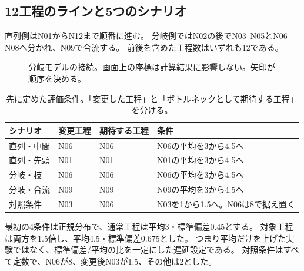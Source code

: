 \documentclass[a4paper,11pt]{ltjsarticle}
\begin{document}
\subsection{12工程のラインと5つのシナリオ}
直列例はN01からN12まで順番に進む。
分岐例ではN02の後でN03--N05とN06--N08へ分かれ、N09で合流する。
前後を含めた工程数はいずれも12である。
\begin{figure}[htbp]\centering
{}
\caption{分岐モデルの接続。画面上の座標は計算結果に影響しない。矢印が順序を決める。}
\end{figure}

\begin{table}[htbp]\centering\small
\begin{tabularx}{\linewidth}{P{29mm}P{20mm}P{19mm}Y}
\toprule シナリオ & 変更工程 & 期待する工程 & 条件\\\midrule
直列・中間 & N06 & N06 & N06の平均を3から4.5へ\\
直列・先頭 & N01 & N01 & N01の平均を3から4.5へ\\
分岐・枝 & N06 & N06 & N06の平均を3から4.5へ\\
分岐・合流 & N09 & N09 & N09の平均を3から4.5へ\\
対照条件 & N03 & N06 & N03を1から1.5へ。N06は8で据え置く\\
\bottomrule\end{tabularx}
\caption{先に定めた評価条件。「変更した工程」と「ボトルネックとして期待する工程」を分ける。}
\end{table}
最初の4条件は正規分布で、通常工程は平均3・標準偏差0.45とする。
対象工程は両方を1.5倍し、平均4.5・標準偏差0.675とした。
つまり平均だけを上げた実験ではなく、標準偏差/平均の比を一定にした遅延設定である。
対照条件はすべて定数で、N06が8、変更後N03が1.5、その他は2とした。
\end{document}
